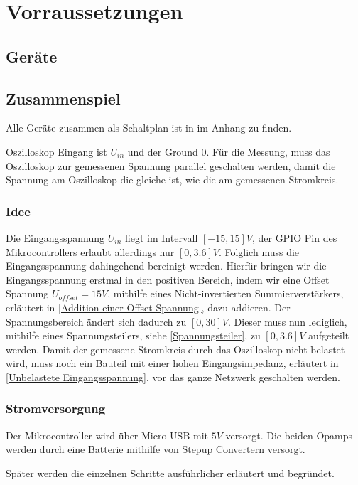 \section{Vorraussetzungen}
\label{Vorraussetzungen}


\subsection{Geräte}




\subsection{Zusammenspiel}

Alle Geräte zusammen als Schaltplan ist in  im Anhang zu finden.


Oszilloskop Eingang ist $U_{in}$ und der Ground $0$. \newline
Für die Messung, muss das Oszilloskop zur gemessenen Spannung parallel geschalten werden,
damit die Spannung am Oszilloskop die gleiche ist, wie die am gemessenen Stromkreis.

\subsubsection{Idee}
Die Eingangsspannung $U_{in}$ liegt im Intervall $[-15, 15] V$,
der GPIO Pin des Mikrocontrollers erlaubt allerdings nur $[0, 3.6] V$. \newline
Folglich muss die Eingangsspannung dahingehend bereinigt werden.
\newline \newline
Hierfür bringen wir die Eingangsspannung erstmal in den positiven Bereich, indem wir
eine Offset Spannung $U_{offset} = 15V$, mithilfe eines Nicht-invertierten Summierverstärkers,
erläutert in \ref{Addition einer Offset-Spannung}, dazu addieren. \newline
Der Spannungsbereich ändert sich dadurch zu $[0, 30] V$.
Dieser muss nun lediglich, mithilfe eines Spannungsteilers, siehe \ref{Spannungsteiler},
zu $[0, 3.6] V$ aufgeteilt werden.
Damit der gemessene Stromkreis durch das Oszilloskop nicht belastet wird,
muss noch ein Bauteil mit einer hohen Eingangsimpedanz, erläutert in \ref{Unbelastete Eingangsspannung},
vor das ganze Netzwerk geschalten werden.


\subsubsection{Stromversorgung}
Der Mikrocontroller wird über Micro-USB mit $5V$ versorgt.
Die beiden Opamps werden durch eine Batterie mithilfe von Stepup Convertern versorgt.

Später werden die einzelnen Schritte ausführlicher erläutert und begründet.



